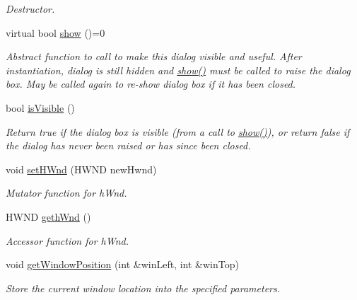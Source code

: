 \begin{DoxyCompactItemize}
\begin{DoxyCompactList}\small\item\em Destructor. \end{DoxyCompactList}\item 
virtual bool \hyperlink{class_dialog_base_af8691afb498d533ac21653fe6bb3aae7}{show} ()=0
\begin{DoxyCompactList}\small\item\em Abstract function to call to make this dialog visible and useful. After instantiation, dialog is still hidden and \hyperlink{class_dialog_base_af8691afb498d533ac21653fe6bb3aae7}{show()} must be called to raise the dialog box. May be called again to re-\/show dialog box if it has been closed. \end{DoxyCompactList}\item 
bool \hyperlink{class_dialog_base_af5164bdea83014336fc32167fffb7ed9}{isVisible} ()
\begin{DoxyCompactList}\small\item\em Return true if the dialog box is visible (from a call to \hyperlink{class_dialog_base_af8691afb498d533ac21653fe6bb3aae7}{show()}), or return false if the dialog has never been raised or has since been closed. \end{DoxyCompactList}\item 
void \hyperlink{class_dialog_base_a88c45a624dc4c6eda42c211b1af31d8e}{setHWnd} (HWND newHwnd)
\begin{DoxyCompactList}\small\item\em Mutator function for hWnd. \end{DoxyCompactList}\item 
HWND \hyperlink{class_dialog_base_a1ce06608bb887ba63e7f41f8f4cf0083}{gethWnd} ()
\begin{DoxyCompactList}\small\item\em Accessor function for hWnd. \end{DoxyCompactList}\item 
void \hyperlink{class_dialog_base_a03d9bd9fcd7546fdd0b717ae6089d9b6}{getWindowPosition} (int \&winLeft, int \&winTop)
\begin{DoxyCompactList}\small\item\em Store the current window location into the specified parameters. \end{DoxyCompactList}\end{DoxyCompactItemize}
